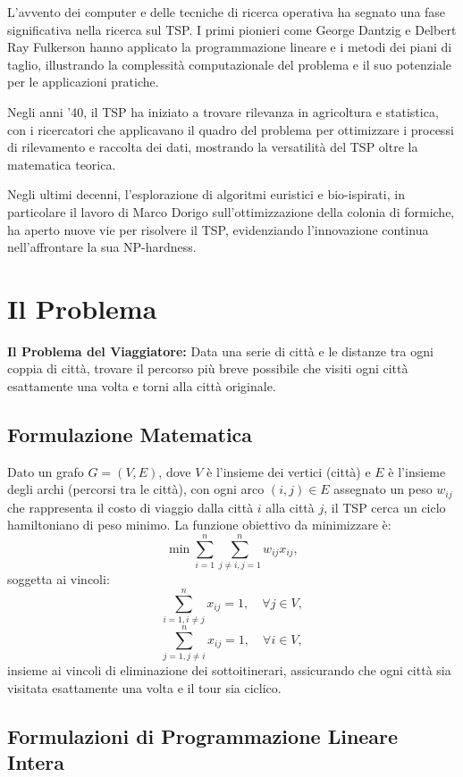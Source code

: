 L'avvento dei computer e delle tecniche di ricerca operativa ha segnato una fase significativa nella ricerca sul \gls{TSP}. I primi pionieri come George Dantzig e Delbert Ray Fulkerson hanno applicato la programmazione lineare e i metodi dei piani di taglio, illustrando la complessità computazionale del problema e il suo potenziale per le applicazioni pratiche.

Negli anni '40, il \gls{TSP} ha iniziato a trovare rilevanza in agricoltura e statistica, con i ricercatori che applicavano il quadro del problema per ottimizzare i processi di rilevamento e raccolta dei dati, mostrando la versatilità del \gls{TSP} oltre la matematica teorica.

Negli ultimi decenni, l'esplorazione di algoritmi euristici e bio-ispirati, in particolare il lavoro di Marco Dorigo sull'ottimizzazione della colonia di formiche, ha aperto nuove vie per risolvere il \gls{TSP}, evidenziando l'innovazione continua nell'affrontare la sua NP-hardness.


\section{Il Problema}

\textbf{Il Problema del Viaggiatore:} Data una serie di città e le distanze tra ogni coppia di città, trovare il percorso più breve possibile che visiti ogni città esattamente una volta e torni alla città originale.

\subsection{Formulazione Matematica}

Dato un grafo \(G = (V, E)\), dove \(V\) è l'insieme dei vertici (città) e \(E\) è l'insieme degli archi (percorsi tra le città), con ogni arco \((i, j) \in E\) assegnato un peso \(w_{ij}\) che rappresenta il costo di viaggio dalla città \(i\) alla città \(j\), il \gls{TSP} cerca un ciclo hamiltoniano di peso minimo.
La funzione obiettivo da minimizzare è:
\[
	\min \sum_{i=1}^{n} \sum_{j \ne i, j=1}^{n} w_{ij} x_{ij},
\]
soggetta ai vincoli:
\[
	\sum_{i=1, i \ne j}^{n} x_{ij} = 1, \quad \forall j \in V,
\]
\[
	\sum_{j=1, j \ne i}^{n} x_{ij} = 1, \quad \forall i \in V,
\]
insieme ai vincoli di eliminazione dei sottoitinerari, assicurando che ogni città sia visitata esattamente una volta e il tour sia ciclico.

\subsection{Formulazioni di Programmazione Lineare Intera}

